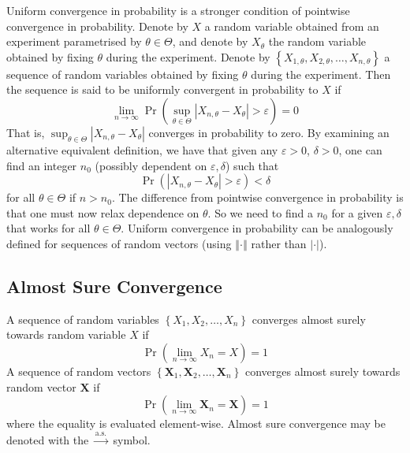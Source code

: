 \documentclass[11pt]{report} %
\begin{document}
Uniform convergence in probability is a stronger condition of pointwise convergence in probability. Denote by $X$ a random variable obtained from an experiment parametrised by $\theta\in\Theta$, and denote by $X_{\theta}$ the random variable obtained by fixing $\theta$ during the experiment. Denote by $\left\{X_{1, \theta}, X_{2, \theta}, \dots, X_{n, \theta}\right\}$ a sequence of random variables obtained by fixing $\theta$ during the experiment. Then the sequence is said to be uniformly convergent in probability to $X$ if
\begin{equation}
\lim_{n\to \infty}\operatorname{Pr}\left(\sup_{\theta\in\Theta}\left|X_{n, \theta} - X_{\theta}\right| > \varepsilon\right) = 0
\end{equation}
That is, $\sup_{\theta\in\Theta}\left|X_{n, \theta} - X_{\theta}\right|$ converges in probability to zero. By examining an alternative equivalent definition, we have that given any $\varepsilon > 0$, $\delta > 0$, one can find an integer $n_{0}$ (possibly dependent on $\varepsilon, \delta$) such that 
\begin{equation}
\operatorname{Pr}\left(\left|X_{n, \theta} - X_{\theta}\right| > \varepsilon\right) < \delta
\end{equation}
for all $\theta\in\Theta$ if $n > n_{0}$. The difference from pointwise convergence in probability is that one must now relax dependence on $\theta$. So we need to find a $n_{0}$ for a given $\varepsilon, \delta$ that works for all $\theta\in\Theta$. Uniform convergence in probability can be analogously defined for sequences of random vectors (using $\left\Vert\cdot\right\Vert$ rather than $\left|\cdot\right|$).

\subsection{Almost Sure Convergence}

A sequence of random variables $\left\{X_{1}, X_{2}, \dots, X_{n} \right\}$ converges almost surely towards random variable $X$ if
\begin{equation}
\operatorname{Pr}\left(\lim_{n\to\infty}X_{n} = X\right) = 1
\end{equation}
A sequence of random vectors $\left\{\mathbf{X}_{1}, \mathbf{X}_{2}, \dots, \mathbf{X}_{n} \right\}$ converges almost surely towards random vector $\mathbf{X}$ if
\begin{equation}
\operatorname{Pr}\left(\lim_{n\to\infty}\mathbf{X}_{n} = \mathbf{X}\right) = 1
\end{equation}
where the equality is evaluated element-wise. Almost sure convergence may be denoted with the $\overset{\mathrm{a.s.}}\to$ symbol.
\end{document}
